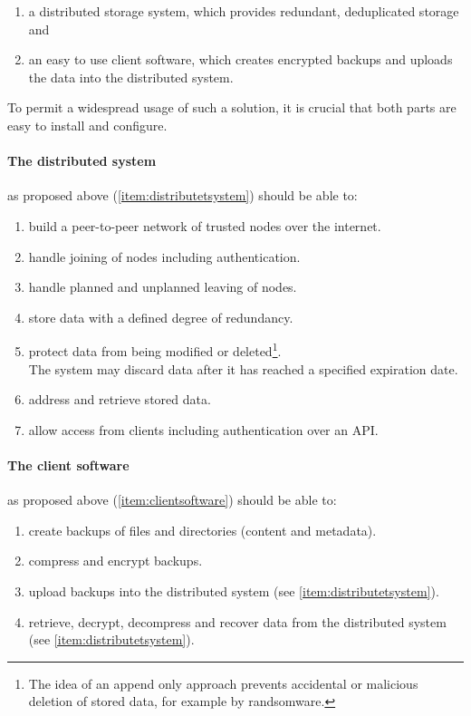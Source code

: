 \documentclass[a4paper]{article}
\begin{document}
\begin{enumerate}
	\item\label{item:distributetsystem} a distributed storage system, which provides redundant, deduplicated storage and
	\item\label{item:clientsoftware} an easy to use client software, which creates encrypted backups and uploads the data into the distributed system.
\end{enumerate}


To permit a widespread usage of such a solution, it is crucial that both parts are easy to install and configure.

\paragraph{The distributed system} as proposed above (\ref{item:distributetsystem}) should be able to:

\begin{enumerate}[label=\alph*.]
	\item  build a peer-to-peer network of trusted nodes over the internet.
	\item handle joining of nodes including authentication.
	\item  handle planned and unplanned leaving of nodes.
	\item  store data with a defined degree of redundancy.
	\item  protect data from being modified or deleted\footnote{The idea of an append only approach prevents accidental or malicious deletion of stored data, for example by randsomware.}. \\The system may discard data after it has reached a specified expiration date.
	\item  address and retrieve stored data.
	\item allow access from clients including authentication over an API.
\end{enumerate}

\paragraph{The client software}as proposed above (\ref{item:clientsoftware}) should be able to:

\begin{enumerate}
	\item create backups of files and directories (content and metadata).
	\item compress and encrypt backups.
	\item upload backups into the distributed system (see \ref{item:distributetsystem}).
	\item retrieve, decrypt, decompress and recover data from the distributed system (see \ref{item:distributetsystem}).
\end{enumerate}
\end{document}
